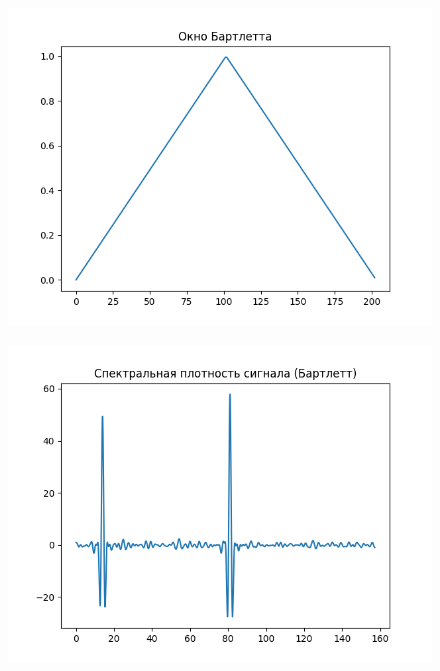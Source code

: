 \documentclass[12pt]{article}
\begin{document}
\begin{figure}[!htb]
\centering
\includegraphics[scale=1.00]{bartletta_window.png}
\caption{}
\label{}
\end{figure}

\begin{figure}[!htb]
\centering
\includegraphics[scale=1.00]{sig_spectral_density_bart.png}
\caption{}
\label{}
\end{figure}
\end{document}
